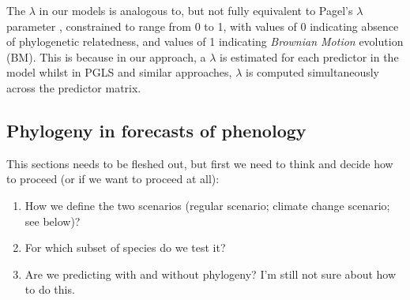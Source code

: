 \documentclass{article}\usepackage[]{graphicx}\usepackage[]{color}
\begin{document}
\item The $\lambda$ in our models is analogous to, but not fully equivalent to Pagel's \cite{pagel1999inferring} $\lambda$ parameter \citep{housworth2004phylogenetic}, constrained to range from 0 to 1, with values of 0 indicating absence of phylogenetic relatedness, and values of 1 indicating \emph{Brownian Motion} evolution (BM). This is because in our approach, a $\lambda$  is estimated for each predictor in the model whilst in PGLS and similar approaches, $\lambda$ is computed simultaneously across the predictor matrix. 








\subsection*{Phylogeny in forecasts of phenology}
This sections needs to be fleshed out, but first we need to think and decide how to proceed (or if we want to proceed at all):

\begin{enumerate}

\item How we define the two scenarios (regular scenario; climate change scenario; see below)?
\item For which subset of species do we test it?
\item Are we predicting with and without phylogeny? I'm still not sure about how to do this.

\end{enumerate}
\end{document}

